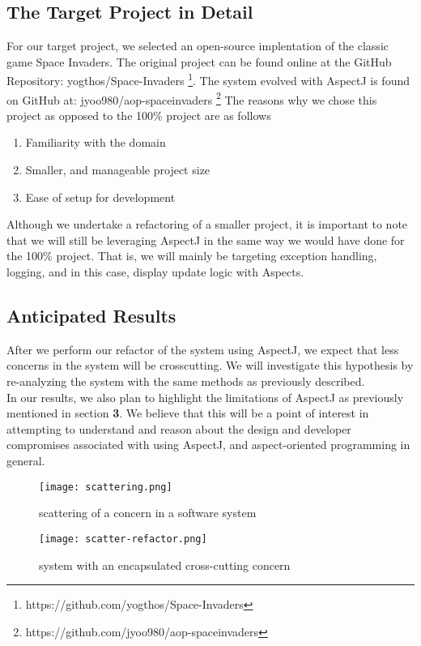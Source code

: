 \documentclass[sigconf]{acmart}
\begin{document}
\subsection{The Target Project in Detail}
For our target project, we selected an open-source implentation of the classic game Space Invaders. The original project can be found online at the GitHub Repository: yogthos/Space-Invaders \footnote{https://github.com/yogthos/Space-Invaders}. The system evolved with AspectJ is found on GitHub at: jyoo980/aop-spaceinvaders \footnote{https://github.com/jyoo980/aop-spaceinvaders} The reasons why we chose this project as opposed to the 100\% project are as follows
\begin{enumerate}
    \item Familiarity with the domain
    \item Smaller, and manageable project size
    \item Ease of setup for development
\end{enumerate}
Although we undertake a refactoring of a smaller project, it is important to note that we will still be leveraging AspectJ in the same way we would have done for the 100\% project. That is, we will mainly be targeting exception handling, logging, and in this case, display update logic with Aspects.

\subsection{Anticipated Results}
After we perform our refactor of the system using AspectJ, we expect that less concerns in the system will be crosscutting. We will investigate this hypothesis by re-analyzing the system with the same methods as previously described. 
\\
In our results, we also plan to highlight the limitations of AspectJ as previously mentioned in section \textbf{3}. We believe that this will be a point of interest in attempting to understand and reason about the design and developer compromises associated with using AspectJ, and aspect-oriented programming in general.
 \begin{figure}
    \centering
    \texttt{[image: scattering.png]}
    \caption{scattering of a concern in a software system}
    \label{fig:1}
\end{figure}

 \begin{figure}
    \centering
    \texttt{[image: scatter-refactor.png]}
    \caption{system with an encapsulated cross-cutting concern}
    \label{fig:1}
\end{figure}
\end{document}
